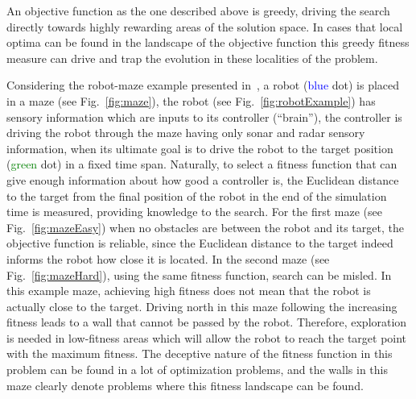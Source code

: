 An objective function as the one described above is greedy, driving the search directly towards highly rewarding areas of the solution space. In cases that local optima can be found in the landscape of the objective function this greedy fitness measure can drive and trap the evolution in these localities of the problem.

Considering the robot-maze example presented in~\citep{lehman2011abandoning,lehman2010revising}, a robot (\textcolor{Blue}{blue} dot) is placed in a maze (see Fig.~\ref{fig:maze}), the robot (see Fig.~\ref{fig:robotExample}) has sensory information which are inputs to its controller (``brain''), the controller is driving the robot through the maze having only sonar and radar sensory information, when its ultimate goal is to drive the robot to the target position (\textcolor{Green}{green} dot) in a fixed time span. Naturally, to select a fitness function that can give enough information about how good a controller is, the Euclidean distance to the target from the final position of the robot in the end of the simulation time is measured, providing knowledge to the search. For the first maze (see Fig.~\ref{fig:mazeEasy}) when no obstacles are between the robot and its target, the objective function is reliable, since the Euclidean distance to the target indeed informs the robot how close it is located. In the second maze (see Fig.~\ref{fig:mazeHard}), using the same fitness function, search can be misled. In this example maze, achieving high fitness does not mean that the robot is actually close to the target. Driving north in this maze following the increasing fitness leads to a wall that cannot be passed by the robot. Therefore, exploration is needed in low-fitness areas which will allow the robot to reach the target point with the maximum fitness. The deceptive nature of the fitness function in this problem can be found in a lot of optimization problems, and the walls in this maze clearly denote problems where this fitness landscape can be found. 

